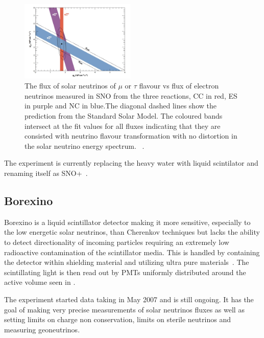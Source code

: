 \begin{figure}[h!]
\centering
  \centering
\includegraphics[width=0.49\textwidth]{figures/snoSpec.jpeg}
\vspace{2mm}
\caption{The flux of solar neutrinos of $\mu$ or $\tau$ flavour vs flux of electron neutrinos measured in SNO from the three reactions, CC in red, ES in purple and NC in blue.The diagonal dashed lines show the prediction from the Standard Solar Model. The coloured bands intersect at the fit values for all fluxes indicating that they are consisted with neutrino flavour transformation with no distortion in the solar neutrino energy spectrum. ~\cite{Fix6}.}
\label{fig:SNO2}
\end{figure}

The experiment is currently replacing the heavy water with liquid scintilator and renaming itself as SNO+~\cite{42SNO+}.

\subsection{Borexino}
Borexino is a liquid scintillator detector making it more sensitive, especially to the low energetic solar neutrinos, than Cherenkov techniques but lacks the ability to detect directionality of incoming particles requiring an extremely low radioactive contamination of the scintillator media. This is handled by containing the detector within shielding material and utilizing ultra pure materials~\cite{63Borexino}. The scintillating light is then read out by PMTs uniformly distributed around the active volume seen in .

The experiment started data taking in May 2007 and is still ongoing. It has the goal of making  very precise measurements of solar neutrinos fluxes as well as setting limits on charge non conservation, limits on sterile neutrinos and measuring geoneutrinos.


